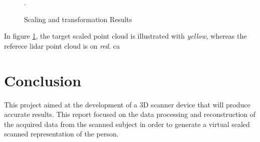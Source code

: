 \documentclass[12pt]{report}
\begin{document}
\begin{figure}[H]%
  \centering
  \qquad
  \qquad
  \qquad
  \qquad
\caption{Scaling and transformation Results}.
\label{fig:scale_results} 
\end{figure}

In figure \ref{fig:scale_results}, the target scaled point cloud is illustrated with \textit{yellow}, whereas the referece lidar point cloud is on \textit{red}.
ca



\chapter{Conclusion}
This project aimed at the development of a 3D scanner device that will produce accurate results. 
This report focused on the data processing and reconstruction of the acquired data from the scanned subject in order to generate a virtual scaled scanned representation of the person.
\end{document}
